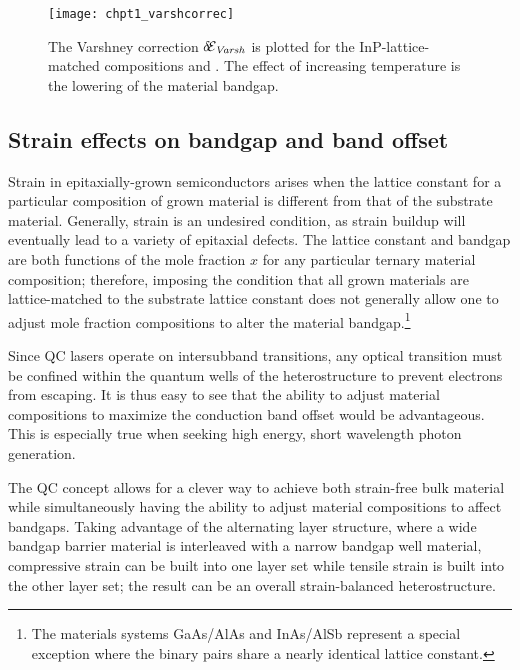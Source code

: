 \documentclass[12pt]{report}
\begin{document}
\begin{figure}[tp]
\centering
\texttt{[image: chpt1\_varshcorrec]}
\caption[Bandgap temperature dependence]{  The Varshney correction $\delta\!\EE_\tn{\textit{Varsh}}$ is plotted for the InP-lattice-matched compositions \InGaAs and \AlInAs.  The effect of increasing temperature is the lowering of the material bandgap.}
\label{chpt1:varsh_correc}
\end{figure}

\subsection{Strain effects on bandgap and band offset}

Strain in epitaxially-grown semiconductors arises when the lattice constant for a particular composition of grown material is different from that of the substrate material.  Generally, strain is an undesired condition, as strain buildup will eventually lead to a variety of epitaxial defects.  The lattice constant and bandgap are both functions of the mole fraction $x$ for any particular ternary material composition; therefore, imposing the condition that all grown materials are lattice-matched to the substrate lattice constant does not generally allow one to adjust mole fraction compositions to alter the material bandgap.\footnote{The materials systems GaAs/AlAs and InAs/AlSb represent a special exception where the binary pairs share a nearly identical lattice constant.}

Since QC lasers operate on intersubband transitions, any optical transition must be confined within the quantum wells of the heterostructure to prevent electrons from escaping.  It is thus easy to see that the ability to adjust material compositions to maximize the conduction band offset would be advantageous. This is especially true when seeking high energy, short wavelength photon generation.

The QC concept allows for a clever way to achieve both strain-free bulk material while simultaneously having the ability to adjust material compositions to affect bandgaps.  Taking advantage of the alternating layer structure, where a wide bandgap barrier material is interleaved with a narrow bandgap well material, compressive strain can be built into one layer set while tensile strain is built into the other layer set; the result can be an overall strain-balanced heterostructure.
\end{document}
